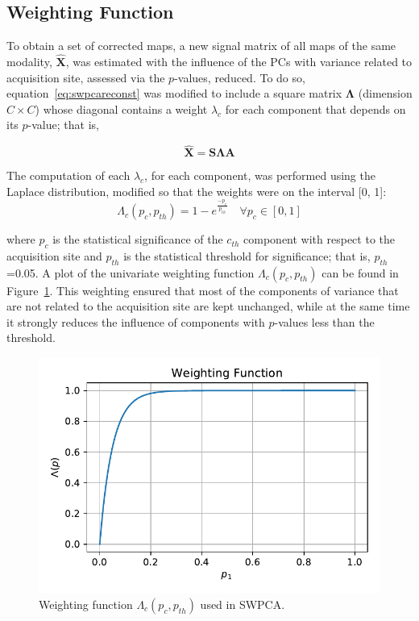 \subsection{Weighting Function}
To obtain a set of corrected maps, a new signal matrix of all maps of the same modality,  $\widehat{\mathbf{X}}$, was estimated with the influence of the PCs with variance related to acquisition site, assessed via the $p$-values, reduced. To do so, equation~\ref{eq:swpcareconst} was modified to include a square matrix $\boldsymbol\Lambda$ (dimension $C\times C$) whose diagonal contains a weight ${\lambda }_{c}$ for each component that depends on its $p$-value; that is,

\begin{equation}
	\widehat{\mathbf{X}} = \mathbf{S}\boldsymbol{\Lambda}\mathbf{A}
\end{equation}

The computation of each ${\lambda }_{c}$, for each component, was performed using the Laplace distribution, modified so that the weights were on the interval [0, 1]:
\begin{equation}
	\Lambda_{c}(p_c, p_{th}) = 1-e^{\frac{-p_c}{p_{th}}} \quad \forall p_c \in \left[0,1\right]
\end{equation}

where  ${p}_{c}$ is the statistical significance of the $c_{th}$ component with respect to the acquisition site and ${p}_{th}$ is the statistical threshold for significance; that is,  ${p}_{th}$=0.05. A plot of the univariate weighting function $\Lambda_c(p_c,p_{th})$ can be found in Figure~\ref{fig:swpcasweigthing}. This weighting ensured that most of the components of variance that are not related to the acquisition site are kept unchanged, while at the same time it strongly reduces the influence of components with $p$-values less than the threshold. 

\begin{figure}
	\centering
	\includegraphics[width=0.6\linewidth]{Graphics/ch7/weighting2}
	\caption[Weighting function $\Lambda_c(p_c,p_{th})$ used in \acs{SWPCA}.]{Weighting function $\Lambda_c(p_c,p_{th})$ used in \ac{SWPCA}.}
	\label{fig:swpcasweigthing}
\end{figure}

